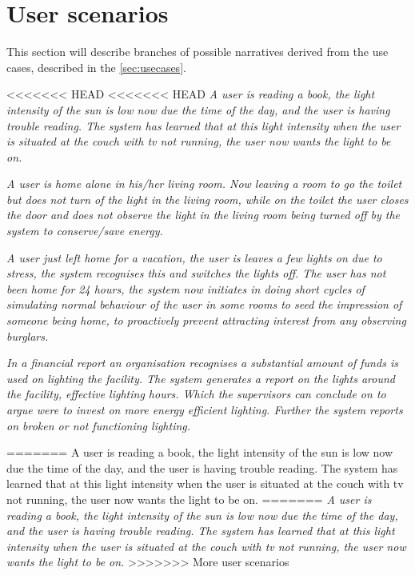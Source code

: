 \section{User scenarios}\label{sec:userscenarious}


This section will describe branches of possible narratives derived from the use cases, described in the \cref{sec:usecases}.

<<<<<<< HEAD
<<<<<<< HEAD
\textit{A user is reading a book, the light intensity of the sun is low now due the time of the day, and the user is having trouble reading. The system has learned that at this light intensity when the user is situated at the couch with tv not running, the user now wants the light to be on.}

\textit{A user is home alone in his/her living room. Now leaving a room to go the toilet but does not turn of the light in the living room, while on the toilet the user closes the door and does not observe the light in the living room being turned off by the system to conserve/save energy.}

\textit{A user just left home for a vacation, the user is leaves a few lights on due to stress, the system recognises this and switches the lights off. The user has not been home for 24 hours, the system now initiates in doing short cycles of simulating normal behaviour of the user in some rooms to seed the impression of someone being home, to proactively prevent attracting interest from any observing burglars.}

\textit{In a financial report an organisation recognises a substantial amount of funds is used on lighting the facility. The system generates a report on the lights around the facility, effective lighting hours. Which the supervisors can conclude on to argue were to invest on more energy efficient lighting. Further the system reports on broken or not functioning lighting.}


=======
A user is reading a book, the light intensity of the sun is low now due the time of the day, and the user is having trouble reading. The system has learned that at this light intensity when the user is situated at the couch with tv not running, the user now wants the light to be on.
=======
\textit{A user is reading a book, the light intensity of the sun is low now due the time of the day, and the user is having trouble reading. The system has learned that at this light intensity when the user is situated at the couch with tv not running, the user now wants the light to be on.}
>>>>>>> More user scenarios

